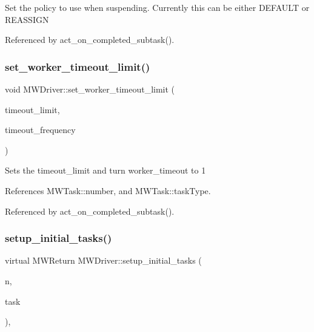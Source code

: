 Set the policy to use when suspending. Currently this can be either D\+E\+F\+A\+U\+LT or R\+E\+A\+S\+S\+I\+GN 

Referenced by act\+\_\+on\+\_\+completed\+\_\+subtask().

\mbox{\label{classMWDriver_ad41f96ba14ccc7712be09c0374eae9c9}} 
\subsubsection{\texorpdfstring{set\+\_\+worker\+\_\+timeout\+\_\+limit()}{set\_worker\_timeout\_limit()}}
{\footnotesize\ttfamily void M\+W\+Driver\+::set\+\_\+worker\+\_\+timeout\+\_\+limit (\begin{DoxyParamCaption}\item[{double}]{timeout\+\_\+limit,  }\item[{int}]{timeout\+\_\+frequency }\end{DoxyParamCaption})}

Sets the timeout\+\_\+limit and turn worker\+\_\+timeout to 1 

References M\+W\+Task\+::number, and M\+W\+Task\+::task\+Type.



Referenced by act\+\_\+on\+\_\+completed\+\_\+subtask().

\mbox{\label{classMWDriver_a618bdbf6e481a903455e068ba37ba0fa}} 
\subsubsection{\texorpdfstring{setup\+\_\+initial\+\_\+tasks()}{setup\_initial\_tasks()}}
{\footnotesize\ttfamily virtual M\+W\+Return M\+W\+Driver\+::setup\+\_\+initial\+\_\+tasks (\begin{DoxyParamCaption}\item[{int $\ast$}]{n,  }\item[{\hyperlink{classMWTask}{M\+W\+Task} $\ast$$\ast$$\ast$}]{task }\end{DoxyParamCaption})\hspace{0.3cm}{\ttfamily [protected]}, {}}

